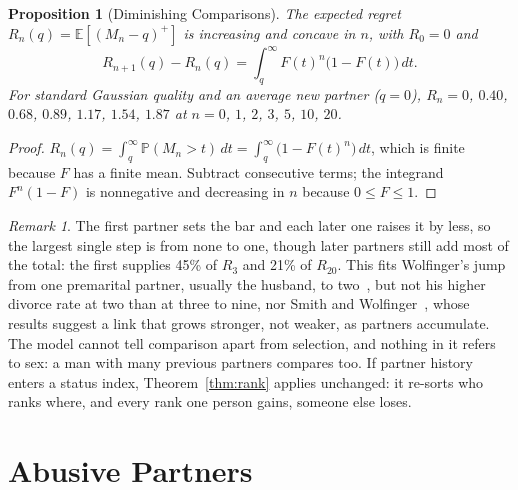 \documentclass[11pt]{article}
\let\oldsection\section
\renewcommand{\section}{\Needspace{0.25\textheight}\oldsection}
\newtheorem{proposition}[theorem]{Proposition}
\theoremstyle{definition}
\theoremstyle{remark}
\newtheorem{remark}[theorem]{Remark}
\begin{document}
\begin{proposition}[Diminishing Comparisons]\label{prop:comparison}
  The expected regret $R_n(q) = \mathbb{E}[(M_n-q)^+]$ is increasing and
  concave in $n$, with $R_0 = 0$ and
  \begin{equation}
    R_{n+1}(q) - R_n(q) = \int_q^\infty F(t)^n\bigl(1-F(t)\bigr)\,dt.
  \end{equation}
  For standard Gaussian quality and an average new partner ($q=0$),
  $R_n = 0$, $0.40$, $0.68$, $0.89$, $1.17$, $1.54$, $1.87$ at $n = 0$,
  $1$, $2$, $3$, $5$, $10$, $20$.
\end{proposition}

\begin{proof}
  $R_n(q) = \int_q^\infty\mathbb{P}(M_n>t)\,dt = \int_q^\infty
  \bigl(1-F(t)^n\bigr)\,dt$, which is finite because $F$ has a finite
  mean. Subtract consecutive terms; the integrand $F^n(1-F)$ is
  nonnegative and decreasing in $n$ because $0\le F\le1$.
\end{proof}

\begin{remark}
  The first partner sets the bar and each later one raises it by less,
  so the largest single step is from none to one, though later partners
  still add most of the total: the first supplies 45\% of $R_3$ and
  21\% of $R_{20}$. This fits Wolfinger's jump from one premarital
  partner, usually the husband, to two~\cite{wolfinger}, but not his
  higher divorce rate at two than at three to nine, nor Smith and
  Wolfinger~\cite{smith}, whose results suggest a link that grows
  stronger, not weaker, as partners accumulate. The model cannot tell
  comparison apart from selection, and nothing in it refers to sex: a
  man with many previous partners compares too. If partner history
  enters a status index, Theorem~\ref{thm:rank} applies unchanged: it
  re-sorts who ranks where, and every rank one person gains, someone
  else loses.
\end{remark}

\section{Abusive Partners}\label{sec:abuse}
\end{document}

